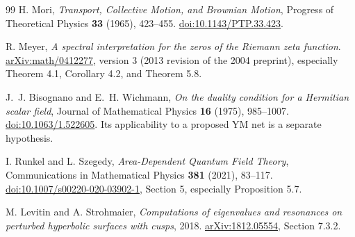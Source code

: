 \begin{thebibliography}{99}
H. Mori, \emph{Transport, Collective Motion, and Brownian
Motion}, Progress of Theoretical Physics \textbf{33}
(1965), 423--455.
\href{https://doi.org/10.1143/PTP.33.423}{doi:10.1143/PTP.33.423}.

R. Meyer, \emph{A spectral interpretation for the zeros of
the Riemann zeta function}.
\href{https://arxiv.org/abs/math/0412277}{arXiv:math/0412277},
version 3 (2013 revision of the 2004 preprint),
especially Theorem 4.1, Corollary 4.2, and Theorem 5.8.

J.~J. Bisognano and E.~H. Wichmann,
\emph{On the duality condition for a Hermitian scalar field},
Journal of Mathematical Physics \textbf{16} (1975), 985--1007.
\href{https://doi.org/10.1063/1.522605}{doi:10.1063/1.522605}.
Its applicability to a proposed YM net is a separate
hypothesis.

I. Runkel and L. Szegedy, \emph{Area-Dependent Quantum
Field Theory}, Communications in Mathematical Physics
\textbf{381} (2021), 83--117.
\href{https://doi.org/10.1007/s00220-020-03902-1}{doi:10.1007/s00220-020-03902-1},
Section 5, especially Proposition 5.7.

M. Levitin and A. Strohmaier,
\emph{Computations of eigenvalues and resonances on
perturbed hyperbolic surfaces with cusps}, 2018.
\href{https://arxiv.org/abs/1812.05554}{arXiv:1812.05554},
Section 7.3.2.
\end{thebibliography}
